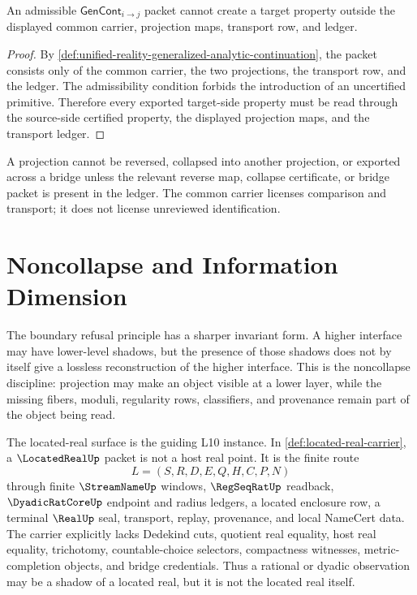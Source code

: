 \begin{theorem}
\label{thm:unified-reality-generalized-continuation-no-new-primitive}
An admissible $\mathsf{GenCont}_{i\to j}$ packet cannot create a target
property outside the displayed common carrier, projection maps, transport
row, and ledger.
\end{theorem}

\begin{proof}
By \autoref{def:unified-reality-generalized-analytic-continuation}, the
packet consists only of the common carrier, the two projections, the
transport row, and the ledger. The admissibility condition forbids the
introduction of an uncertified primitive. Therefore every exported
target-side property must be read through the source-side certified
property, the displayed projection maps, and the transport ledger.
\end{proof}

\begin{principle}
\label{prin:unified-reality-boundary-refusal}
A projection cannot be reversed, collapsed into another projection, or
exported across a bridge unless the relevant reverse map, collapse
certificate, or bridge packet is present in the ledger. The common
carrier licenses comparison and transport; it does not license
unreviewed identification.
\end{principle}

\section{Noncollapse and Information Dimension}
\label{sec:unified-reality-noncollapse-information-dimension}

The boundary refusal principle has a sharper invariant form. A higher
interface may have lower-level shadows, but the presence of those shadows
does not by itself give a lossless reconstruction of the higher
interface. This is the noncollapse discipline: projection may make an
object visible at a lower layer, while the missing fibers, moduli,
regularity rows, classifiers, and provenance remain part of the object
being read.

The located-real surface is the guiding L10 instance. In
\autoref{def:located-real-carrier}, a $\LocatedRealUp$ packet is not a
host real point. It is the finite route
$$
L=(S,R,D,E,Q,H,C,P,N)
$$
through finite $\StreamNameUp$ windows, $\RegSeqRatUp$ readback,
$\DyadicRatCoreUp$ endpoint and radius ledgers, a located enclosure row,
a terminal $\RealUp$ seal, transport, replay, provenance, and local
NameCert data. The carrier explicitly lacks Dedekind cuts, quotient
real equality, host real equality, trichotomy, countable-choice
selectors, compactness witnesses, metric-completion objects, and bridge
credentials. Thus a rational or dyadic observation may be a shadow of a
located real, but it is not the located real itself.

